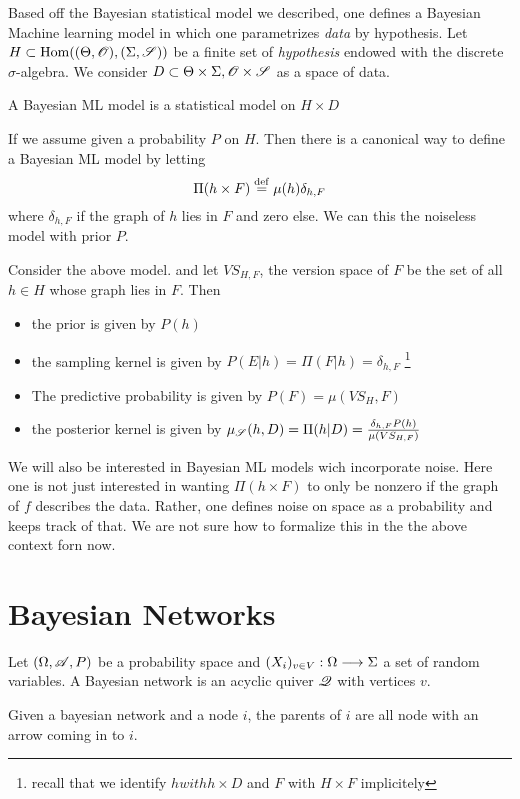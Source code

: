 Based off the Bayesian statistical model we described, one defines a Bayesian Machine learning  model in which one parametrizes \emph{data} by hypothesis.
 Let $H\subset \Hom((\Theta,\r{O}),(\Sigma,\r{S}))$ be a finite set of \emph{hypothesis} endowed with the discrete $\sigma$-algebra. We consider  $D\subset \Theta\times \Sigma, \r{O}\times \r{S}$ as a space  of data.

\begin{definition}
A Bayesian ML model is a statistical model on $H\times D$	
\end{definition}


If we assume given a probability $P$ on $H$. Then there is a canonical way to define a Bayesian ML model by letting
\[
\Pi(h\times F)\stackrel{\operatorname{def}}{=} \mu(h)\delta_{h,F}
\]
where $\delta_{h,F}$ if the graph of $h$ lies in $F$ and zero else. We can this the noiseless model with prior $P$.

\begin{lemma}
Consider the above model. and let $VS_{H,F}$, the version space of $F$ be the set of all $h \in H$ whose graph lies in $F$. Then
\begin{itemize}
\item the prior is given by $P(h)$
\item the sampling kernel is given by $P(E\vert h)=\Pi(F\vert h)=\delta_{h,F}$
\footnote{recall that we identify $h with h\times D$ and $F$ with $H\times F$ implicitely}
\item The predictive probability is	given by $P(F)= \mu(VS_H,F)$

\item the posterior kernel is given by $\mu_\r{S}(h,D)=\Pi(h\vert D)=\frac{\delta_{h,F}P(h)}{\mu(VS_{H,F})}$
\end{itemize}
\end{lemma}

We will also be interested in Bayesian ML models wich incorporate noise. Here one is not just interested in wanting $\Pi(h\times F)$ to only be nonzero if the graph of $f$ describes the data. Rather, one defines noise on space as a probability and keeps track of that. We are not sure how to formalize this in the the above context forn now.

\section{Bayesian Networks}

\begin{definition}
Let $(\Omega,\r{A},P)$ be a probability space and $(X_i)_{v \in V}: \Omega\longrightarrow \Sigma$ a set of random variables.
A Bayesian network is an acyclic	 quiver  $\Qvr$ with vertices $v$.\\
\end{definition}
Given a bayesian network and a node $i$, the parents of $i$ are all node with an arrow coming in to $i$.

